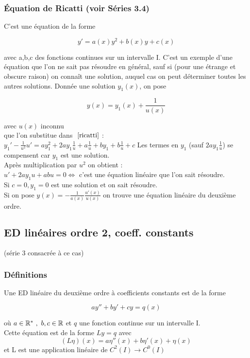 \documentclass[12pt,a4paper]{article}
\begin{document}
\subsubsection[Ricatti]{Équation de Ricatti (voir Séries 3.4)}
C'est une équation de la forme 
\begin{boite}
	\begin{equation}
		y' = a(x)y^2 + b(x)y + c(x)
		\label{ricatti}
	\end{equation}
\end{boite}
avec a,b,c des fonctions continues sur un intervalle I. C'est un exemple d'une équation que l'on ne sait pas résoudre en général, sauf si (pour une étrange et obscure raison) on connaît une solution, auquel cas on peut déterminer toutes les autres solutions. Donnée une solution $y_1(x)$, on pose
\begin{boite}[0.5]
	\begin{equation*}
		y(x) = y_1(x) + \frac{1}{u(x)}
	\end{equation*}
\end{boite}
avec $u(x)$ inconnu\\
que l'on substitue dans $~\eqref{ricatti}$ :\\
$y_1' - \frac{1}{u^2}u' = ay_1^2 + 2ay_1\frac{1}{u} + a \frac{1}{u} + by_1 + b\frac{1}{u} + c$
Les termes en $y_1$ (sauf $2ay_1\frac{1}{u}$) se compensent car $y_1$ est une solution.\\
Après multiplication par $u^2$ on obtient :\\
$u'+ 2ay_1u + a bu = 0 \iff $ c'est une équation linéaire que l'on sait résoudre.\\
 Si $c=0, y_1 = 0$ est une solution et on sait résoudre.\\
 Si on pose $y(x) = -\frac{1}{a(x)}\frac{u'(x)}{u(x)}$ on trouve une équation linéaire du deuxième ordre.

\subsection{ED linéaires ordre 2, coeff. constants}
(série 3 consacrée à ce cas)

\subsubsection{Définitions}
Une ED linéaire du deuxième ordre à coefficients constants est de la forme
\begin{boite}[0.5]
	\begin{equation}
		ay''+by'+cy = q(x)
		\label{second ordre lineaire}
	\end{equation}
\end{boite}
où $a\in \mathbb{R}^*\ , \ b,c \in\mathbb{R}$ et $q$ une fonction continue sur un intervalle I.\\
Cette équation est de la forme $Ly = q$ avec 
\begin{equation*}
(L\eta)(x) = a\eta''(x) + b\eta'(x) + \eta(x)
\end{equation*}
et L est une application linéaire de $C^2(I) \to C^0(I)$
\newpage
\end{document}
